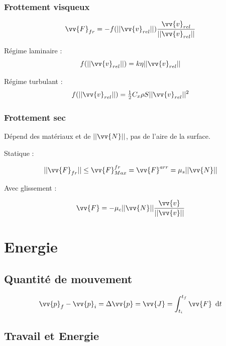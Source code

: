 \documentclass[landscape,a4paper]{article}
\newcommand{\dee}[1]{
  \,\,\,\mathrm{d}{#1}
}
\newcommand{\F}{\ensuremath{\vv{F}}}
\newcommand{\vi}{\ensuremath{\vv{v}}}
\begin{document}
\begin{multicols}{4}

  \subsubsection{Frottement visqueux}
  \[
    \F_{fr} = -f(||\vi_{rel}||)\frac{\vi_{rel}}{||\vi_{rel}||}
  \]

  Régime laminaire : 
  \[
    f(||\vi_{rel}||)=k\eta||\vi_{rel}||
  \]

  Régime turbulant :
  \[
    f(||\vi_{rel}||) = \tfrac{1}{2}C_x\rho S||\vi_{rel}||^2
  \]

  \subsubsection{Frottement sec}
  Dépend des matériaux et de \(||\vv{N}||\), pas de l'aire de la surface. 

  Statique :

  \[
    ||\F_{fr}|| \leq \F_{Max}^{fr} = \F^{arr}= \mu_s||\vv{N}||
  \]

  Avec glissement :

  \[
    \F=-\mu_c||\vv{N}||\frac{\vi}{||\vi||}
  \]

  \section{Energie}
  \subsection{Quantité de mouvement}
  \[
    \vv{p}_f - \vv{p}_i = \Delta\vv{p} = \vv{J} = \int_{t_i}^{t_f}\F\dee{t}
  \]

  \subsection{Travail et Energie}


\end{multicols}
\end{document}
